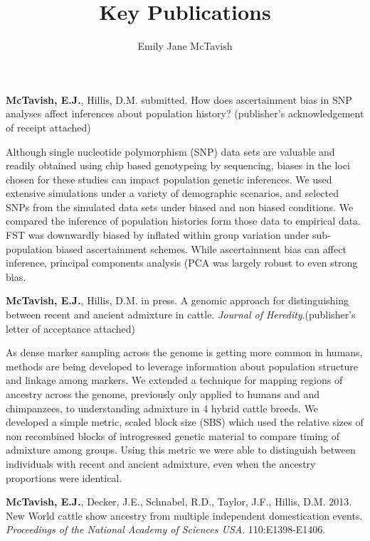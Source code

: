 \documentclass[a4paper,10pt]{article}
\title{Key Publications}
\author{Emily Jane McTavish}
\begin{document}
\maketitle

\textbf{McTavish, E.J.}, Hillis, D.M. submitted. How does ascertainment bias in SNP analyses affect inferences about population history? (publisher’s acknowledgement of receipt attached)

Although single nucleotide polymorphism (SNP) data sets are valuable and readily obtained using chip based genotypeing by sequencing, biases in the loci chosen for these studies can impact population genetic inferences. 
We used extensive simulations under a variety of demographic scenarios, and selected SNPs from the simulated data sets under biased and non biased conditions. 
We compared the inference of population histories form those data to empirical data. 
FST was downwardly biased by inflated within group variation under sub-population biased ascertainment schemes. 
While ascertainment bias can affect inference, principal components analysis (PCA was largely robust to even strong bias.

\textbf{McTavish, E.J.}, Hillis, D.M. in press. A genomic approach for distinguishing between recent and ancient admixture in cattle.  \textsl{Journal of Heredity}.(publisher’s letter of acceptance attached)

As dense marker sampling across the genome is getting more common in humans, methods are being developed to leverage information about population structure and linkage among markers. 
We extended a technique for mapping regions of ancestry across the genome, previously only applied to humans and and chimpanzees, to understanding admixture in 4 hybrid cattle breeds. 
We developed a simple metric, scaled block size (SBS) which used the relative sizes of non recombined blocks of introgressed genetic material to compare timing of admixture among groups. 
Using this metric we were able to distinguish between individuals with recent and ancient admixture, even when the ancestry proportions were identical.

\textbf{McTavish, E.J.}, Decker, J.E., Schnabel, R.D., Taylor, J.F., Hillis, D.M. 2013. New World cattle show ancestry from multiple independent domestication events.  \textsl{Proceedings of the National Academy of Sciences USA}. 110:E1398-E1406.
\end{document}

